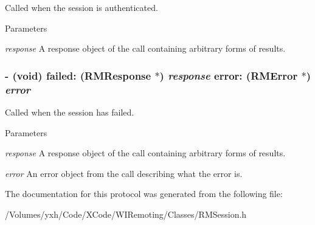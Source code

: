 Called when the session is authenticated. 
\begin{DoxyParams}{Parameters}
\item[{\em response}]A response object of the call containing arbitrary forms of results. \end{DoxyParams}
\hypertarget{protocol_r_m_session_delegate-p_acc1de0a74fa842d993eb9b6d33cd6e38}{
\subsubsection[{failed:error:}]{\setlength{\rightskip}{0pt plus 5cm}-\/ (void) failed: ({\bf RMResponse} $\ast$) {\em response}\/ error: (RMError $\ast$) {\em error}}}
\label{protocol_r_m_session_delegate-p_acc1de0a74fa842d993eb9b6d33cd6e38}


Called when the session has failed. 
\begin{DoxyParams}{Parameters}
\item[{\em response}]A response object of the call containing arbitrary forms of results. \item[{\em error}]An error object from the call describing what the error is. \end{DoxyParams}


The documentation for this protocol was generated from the following file:\begin{DoxyCompactItemize}
\item 
/Volumes/yxh/Code/XCode/WIRemoting/Classes/RMSession.h\end{DoxyCompactItemize}

